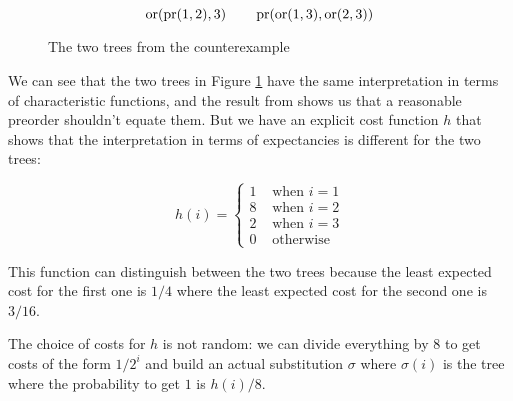 \begin{figure}[h]

    \begin{ensps}
    \begin{center}
        \hspace{2em}
    \end{center}
    \end{ensps}
    \begin{equation*}
        \operatorname{or} (\operatorname{pr} (1,2), 3) \quad \quad \operatorname{pr} (\operatorname{or} (1,3), \operatorname{or} (2,3))
    \end{equation*}
    \caption{The two trees from the counterexample}
    \label{fig:counterexampletree}
\end{figure}

We can see that the two trees in Figure \ref{fig:counterexampletree} 
have the same interpretation in terms of characteristic functions,
and the result from \cite{Mislove2000} shows us that a reasonable 
preorder shouldn't equate them. But we have an explicit 
cost function $h$ that shows that the interpretation in terms of 
expectancies is different for the two trees:

\begin{equation*}
    h (i) = \begin{cases}
        1 & \text{ when } i = 1 \\
        8 & \text{ when } i = 2 \\
        2 & \text{ when } i = 3 \\
        0 & \text{ otherwise } 
    \end{cases}
\end{equation*}

This function can distinguish between the two trees 
because the least expected cost for the first one is $1/4$
where the least expected cost for the second one is $3/16$.

The choice of costs for $h$ is not random: we can divide 
everything by $8$ to get costs of the form $1/2^i$ 
and build an actual substitution $\sigma$ where $\sigma(i)$ 
is the tree where the probability to get $1$ is $h(i)/8$.
